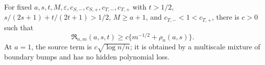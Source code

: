For fixed \(a,s,t,M,\varepsilon,c_{S,-},c_{S,+},c_{T,-},c_{T,+}\) with \(t>1/2\), \(s/(2s+1)+t/(2t+1)>1/2\), \(M\ge a+1\), and \(c_{T,-}<1<c_{T,+}\), there is \(c>0\) such that \[\mathfrak R_{n,m}(a,s,t)\ge c\{m^{-1/2}+\rho_n(a,s)\}.\] At \(a=1\), the source term is \(c\sqrt{\log n/n}\); it is obtained by a multiscale mixture of boundary bumps and has no hidden polynomial loss.